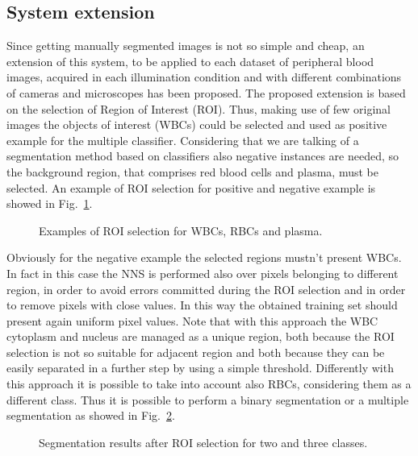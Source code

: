 \documentclass[final,a4paper,12pt,english]{UnicaPhdThesis3}
\begin{document}
	\subsection{System extension}
	Since getting manually segmented images is not so simple and cheap, an extension of this system, to be applied to each dataset of peripheral blood images, acquired in each illumination condition and with different combinations of cameras and microscopes has been proposed. The proposed extension is based on the selection of Region of Interest (\acs{ROI}). Thus, making use of few original images the objects of interest (WBCs) could be selected and used as positive example for the multiple classifier. Considering that we are talking of a segmentation method based on classifiers also negative instances are needed, so the background region, that comprises red blood cells and plasma, must be selected. An example of ROI selection for positive and negative example is showed in Fig.~\ref{fig:ex6}.
	
	\begin{figure}[!b]
		\centering
		\caption{\label{fig:ex6}Examples of ROI selection for WBCs, RBCs and plasma.}
	\end{figure}
	
	Obviously for the negative example the selected regions mustn't present WBCs. In fact in this case the NNS is performed also over pixels belonging to different region, in order to avoid errors committed during the ROI selection and in order to remove pixels with close values. In this way the obtained training set should present again uniform pixel values. Note that with this approach the WBC cytoplasm and nucleus are managed as a unique region, both because the ROI selection is not so suitable for adjacent region and both because they can be easily separated in a further step by using a simple threshold. Differently with this approach it is possible to take into account also RBCs, considering them as a different class. Thus it is possible to perform a binary segmentation or a multiple segmentation as showed in Fig.~\ref{fig:ex7}.
	
	\begin{figure}[!htbp]
		\centering
		\caption{\label{fig:ex7}Segmentation results after ROI selection for two and three classes.}
	\end{figure}
	
\end{document}

